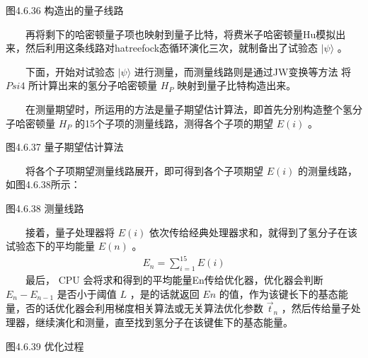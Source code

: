 \documentclass[a4paper,11pt,english]{sphinxmanual}
\begin{document}
\begin{center}图4.6.36 构造出的量子线路
\end{center}
\sphinxAtStartPar
  再将剩下的哈密顿量子项也映射到量子比特，将费米子哈密顿量Hu模拟出来，然后利用这条线路对hatree\sphinxhyphen{}fock态循环演化三次，就制备出了试验态 \(|\psi\rangle\) 。

\sphinxAtStartPar
  下面，开始对试验态 \(|\psi\rangle\) 进行测量，而测量线路则是通过J\sphinxhyphen{}W变换等方法 将 \(Psi4\) 所计算出来的氢分子哈密顿量 \(H_P\) 映射到量子比特构造出来。

\sphinxAtStartPar
  在测量期望时，所运用的方法是量子期望估计算法，即首先分别构造整个氢分子哈密顿量 \(H_P\) 的15个子项的测量线路，测得各个子项的期望 \(E(i)\) 。


\begin{center}图4.6.37 量子期望估计算法
\end{center}
\sphinxAtStartPar
  将各个子项期望测量线路展开，即可得到各个子项期望 \(E(i)\) 的测量线路，如图4.6.38所示：


\begin{center}图4.6.38 测量线路
\end{center}
\sphinxAtStartPar
  接着，量子处理器将 \(E(i)\) 依次传给经典处理器求和，就得到了氢分子在该试验态下的平均能量 \(E(n)\) 。
\begin{equation*}
\begin{split}E_{n}=\sum_{i=1}^{15} E(i)\end{split}
\end{equation*}
\sphinxAtStartPar
  最后， \(\mathrm{CPU}\) 会将求和得到的平均能量En传给优化器，优化器会判断 \(E_n - E_{n-1}\) 是否小于阈值 \(L\) ，是的话就返回 \(En\) 的值，作为该键长下的基态能量，否的话优化器会利用梯度相关算法或无关算法优化参数 \(\vec{t}_{n}\) ，然后传给量子处理器，继续演化和测量，直至找到氢分子在该键隹下的基态能量。


\begin{center}图4.6.39 优化过程
\end{center}
\end{document}
